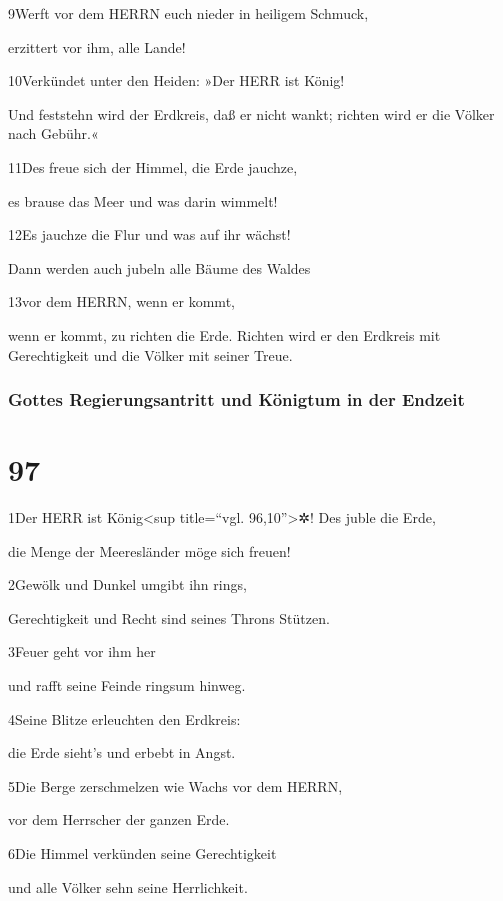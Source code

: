9Werft vor dem HERRN euch nieder in heiligem Schmuck,

erzittert vor ihm, alle Lande!

10Verkündet unter den Heiden: »Der HERR ist König!

Und feststehn wird der Erdkreis, daß er nicht wankt; richten wird er die
Völker nach Gebühr.«

11Des freue sich der Himmel, die Erde jauchze,

es brause das Meer und was darin wimmelt!

12Es jauchze die Flur und was auf ihr wächst!

Dann werden auch jubeln alle Bäume des Waldes

13vor dem HERRN, wenn er kommt,

wenn er kommt, zu richten die Erde. Richten wird er den Erdkreis mit
Gerechtigkeit und die Völker mit seiner Treue.

\hypertarget{gottes-regierungsantritt-und-kuxf6nigtum-in-der-endzeit}{%
\subsubsection{Gottes Regierungsantritt und Königtum in der
Endzeit}\label{gottes-regierungsantritt-und-kuxf6nigtum-in-der-endzeit}}

\hypertarget{section-96}{%
\section{97}\label{section-96}}

1Der HERR ist König\textless sup title=``vgl. 96,10''\textgreater✲! Des
juble die Erde,

die Menge der Meeresländer möge sich freuen!

2Gewölk und Dunkel umgibt ihn rings,

Gerechtigkeit und Recht sind seines Throns Stützen.

3Feuer geht vor ihm her

und rafft seine Feinde ringsum hinweg.

4Seine Blitze erleuchten den Erdkreis:

die Erde sieht's und erbebt in Angst.

5Die Berge zerschmelzen wie Wachs vor dem HERRN,

vor dem Herrscher der ganzen Erde.

6Die Himmel verkünden seine Gerechtigkeit

und alle Völker sehn seine Herrlichkeit.

